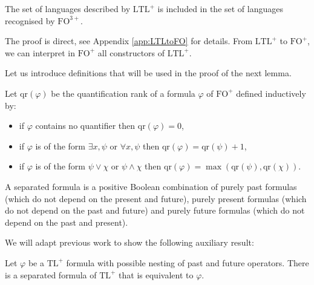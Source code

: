 \documentclass[a4paper,UKenglish,cleveref, autoref, thm-restate]{lipics-v2021}
\newcommand{\FO}{\mathrm{FO}}
\newcommand{\FOp}{\FO^+}
\newcommand{\FOthp}{\FO^{3+}}
\newcommand{\LTL}{\mathrm{LTL}}
\newcommand{\LTLp}{\LTL^+}
\newcommand{\TL}{\mathrm{TL}}
\newcommand{\TLp}{\TL^+}
\newcommand{\qr}{\mathrm{qr}}
\begin{document}
\begin{lemma}\label{LTLtoFO}
    The set of languages described by $\LTLp$ is included in the set of languages recognised by $\FOthp$.\end{lemma}


The proof is direct, see Appendix \ref{app:LTLtoFO} for details. From $\LTLp$ to $\FOp$, we can interpret in $\FOp$ all constructors of $\LTLp$.












Let us introduce definitions that will be used in the proof of the next lemma.

\begin{definition}
    Let $\qr(\varphi)$ be the quantification rank of a formula $\varphi$ of $\FOp$ defined inductively by:
    \begin{itemize}
        \item if $\varphi$ contains no quantifier then $\qr(\varphi) = 0$,
        \item if $\varphi$ is of the form $\exists x, \psi$ or $\forall x, \psi$ then $\qr(\varphi) = \qr(\psi) + 1$,
        \item if $\varphi$ is of the form $\psi \lor \chi$ or $\psi \land \chi$ then $\qr(\varphi) = \max(\qr(\psi),\qr(\chi))$.
    \end{itemize}
\end{definition}

\begin{definition}
    A separated formula is a positive Boolean combination of purely past formulas (which do not depend on the present and future), purely present formulas (which do not depend on the past and future) and purely future formulas (which do not depend on the past and present).
\end{definition}

We will adapt previous work to show the following auxiliary result:

\begin{lemma}\label{lem:separation}
    Let $\varphi$ be a $\TLp$ formula with possible nesting of past and future operators. There is a separated formula of $\TLp$ that is equivalent to $\varphi$.
\end{lemma}
\end{document}
